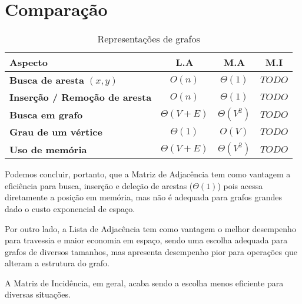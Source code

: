 
\section{Comparação}
\begin{table}[H]
\centering
\caption{Representações de grafos}
\begin{tabular}{|l|c|c|c|}
\hline
\textbf{Aspecto} & \textbf{L.A} & \textbf{M.A} & \textbf{M.I} \\ \hline
\textbf{Busca de aresta} $(x, y)$ & $O(n)$ & $\Theta(1)$ & $TODO$ \\ \hline
\textbf{Inserção / Remoção de aresta} & $O(n)$ & $\Theta(1)$ & $TODO$ \\ \hline
\textbf{Busca em grafo} & $\Theta(V + E)$ & $\Theta(V^2)$ & $TODO$ \\ \hline
\textbf{Grau de um vértice} & $\Theta(1)$ & $O(V)$ & $TODO$ \\ \hline
\textbf{Uso de memória} & $\Theta(V + E)$ & $\Theta(V^2)$ & $TODO$ \\ \hline
\end{tabular}
\vspace{0.3em}
\end{table}

Podemos concluir, portanto, que a Matriz de Adjacência tem como vantagem a eficiência para busca, inserção e deleção de arestas ($\Theta(1)$) pois acessa diretamente a posição em memória, mas não é adequada para grafos grandes dado o custo exponencial de espaço. 

Por outro lado, a Lista de Adjacência tem como vantagem o melhor desempenho para travessia e maior economia em espaço, sendo uma escolha adequada para grafos de diversos tamanhos, mas apresenta desempenho pior para operações que alteram a estrutura do grafo.

A Matriz de Incidência, em geral, acaba sendo a escolha menos eficiente para diversas situações.


